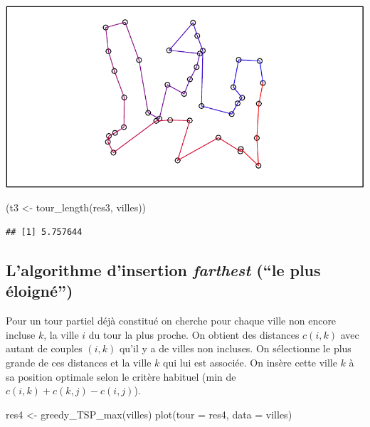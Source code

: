 \documentclass[
]{article}
\newenvironment{Shaded}{\begin{snugshade}}{\end{snugshade}}
\newcommand{\AttributeTok}[1]{\textcolor[rgb]{0.77,0.63,0.00}{#1}}
\newcommand{\FunctionTok}[1]{\textcolor[rgb]{0.00,0.00,0.00}{#1}}
\newcommand{\NormalTok}[1]{#1}
\newcommand{\OtherTok}[1]{\textcolor[rgb]{0.56,0.35,0.01}{#1}}
\begin{document}
\includegraphics{rapport_TSP_files/figure-latex/unnamed-chunk-6-1.pdf}

\begin{Shaded}
\begin{Highlighting}[]
\NormalTok{(t3 }\OtherTok{\textless{}{-}} \FunctionTok{tour\_length}\NormalTok{(res3, villes))}
\end{Highlighting}
\end{Shaded}

\begin{verbatim}
## [1] 5.757644
\end{verbatim}

\hypertarget{lalgorithme-dinsertion-farthest-le-plus-uxe9loignuxe9}{%
\subsection{\texorpdfstring{L'algorithme d'insertion \emph{farthest}
(``le plus
éloigné'')}{L'algorithme d'insertion farthest (``le plus éloigné'')}}\label{lalgorithme-dinsertion-farthest-le-plus-uxe9loignuxe9}}

Pour un tour partiel déjà constitué on cherche pour chaque ville non
encore incluse \(k\), la ville \(i\) du tour la plus proche. On obtient
des distances \(c(i,k)\) avec autant de couples \((i,k)\) qu'il y a de
villes non incluses. On sélectionne le plus grande de ces distances et
la ville \(k\) qui lui est associée. On insère cette ville \(k\) à sa
position optimale selon le critère habituel (min de
\(c(i,k) + c(k,j) - c(i,j)\)).

\begin{Shaded}
\begin{Highlighting}[]
\NormalTok{res4 }\OtherTok{\textless{}{-}} \FunctionTok{greedy\_TSP\_max}\NormalTok{(villes)}
\FunctionTok{plot}\NormalTok{(}\AttributeTok{tour =}\NormalTok{ res4, }\AttributeTok{data =}\NormalTok{ villes)}
\end{Highlighting}
\end{Shaded}
\end{document}
